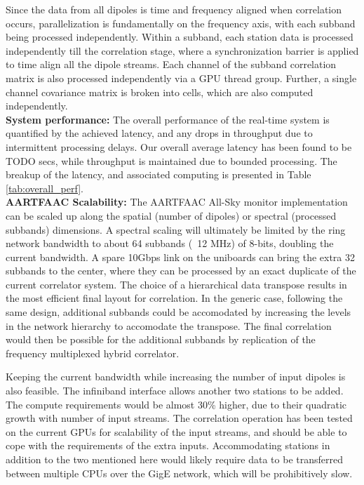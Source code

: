 \documentclass{ws-jai}
\begin{document}
Since the data from all dipoles is time and frequency aligned when correlation occurs,
   parallelization  is
fundamentally  on  the  frequency  axis,   with  each  subband  being  processed
independently.  Within a  subband, each station data  is processed independently
till the correlation  stage, where a synchronization barrier is  applied to time
align all the dipole streams.  Each channel of the subband correlation matrix is
also processed independently via a GPU  thread group.  Further, a single channel
covariance matrix is broken into cells, which are also computed independently.\\


\noindent \textbf {System performance:} The overall performance of the real-time
system is quantified by the achieved latency, and any drops in throughput due to
intermittent processing delays. Our overall average latency has been found to be
TODO secs, while throughput is maintained due to bounded processing. The breakup
of   the   latency,   and   associated   computing   is   presented   in   Table
\ref{tab:overall_perf}.\\

\noindent  \textbf   {AARTFAAC  Scalability:}   The  AARTFAAC   All-Sky  monitor
implementation  can be  scaled  up  along the  spatial  (number  of dipoles)  or
spectral (processed subbands) dimensions. A  spectral scaling will ultimately be
limited by the ring network bandwidth to  about 64 subbands (~12 MHz) of 8-bits,
doubling the current  bandwidth. A spare 10Gbps link on  the uniboards can bring
the extra  32 subbands to the  center, where they  can be processed by  an exact
duplicate of  the current correlator system.  The choice of a  hierarchical data
transpose results  in the most efficient  final layout for correlation.   In the
generic  case,  following   the  same  design,  additional   subbands  could  be
accomodated by increasing the levels in  the network hierarchy to accomodate the
transpose.   The final  correlation would  then be  possible for  the additional
subbands by replication of the frequency multiplexed hybrid correlator.

Keeping the  current bandwidth while increasing  the number of input  dipoles is
also  feasible. The  infiniband  interface  allows another  two  stations to  be
added.  The compute  requirements  would be  almost 30\%  higher,  due to  their
quadratic growth  with number of  input streams.  The correlation  operation has
been tested on the current GPUs for scalability of the input streams, and should
be  able to  cope  with  the requirements  of  the  extra inputs.  Accommodating
stations in addition to  the two mentioned here would likely  require data to be
transferred  between  multiple  CPUs  over  the  GigE  network,  which  will  be
prohibitively slow.\\
\end{document}
